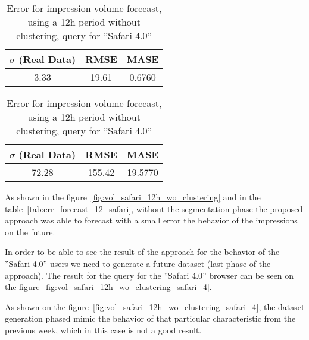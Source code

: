 \begin{table}[!ht]
\centering
\footnotesize
\begin{minipage}[t]{0.45\linewidth}
\centering
\begin{tabular}{ccc}
 $\sigma$ (Real Data) & RMSE & MASE   \\ \hline
 3.33      & 19.61        & 0.6760   \\
\end{tabular}

\vspace{0.5cm}

\caption[Volume
impression forecast, safari]{Error for impression volume
forecast, using a 12h period without clustering}
\label{tab:err_forecast_12_safari}
\end{minipage}
\quad
\begin{minipage}[t]{0.45\linewidth}
\centering
\begin{tabular}{ccc}
 $\sigma$ (Real Data) & RMSE & MASE   \\ \hline
72.28      &  155.42       & 19.5770   \\
\end{tabular}

\vspace{0.5cm}

\caption[Volume
impression forecast, safari]{Error for impression volume
forecast, using a 12h period without clustering, query for ''Safari 4.0''}
\label{tab:err_forecast_12_safari_wo_clustering_safari_4}

\end{minipage}
\end{table}

As shown in the figure~\ref{fig:vol_safari_12h_wo_clustering} and in the
table~\ref{tab:err_forecast_12_safari}, without the segmentation phase the
proposed approach was able to forecast with a small error the behavior of the
impressions on the future.

In order to be able to see the result of the approach for the behavior of the
''Safari 4.0'' users we need to generate a future dataset (last phase of the
approach). The result for the query for the ''Safari 4.0'' browser can be seen
on the figure~\ref{fig:vol_safari_12h_wo_clustering_safari_4}.

As shown on the figure~\ref{fig:vol_safari_12h_wo_clustering_safari_4}, the
dataset generation phased mimic the behavior of that particular characteristic
from the previous week, which in this case is not a good result.

